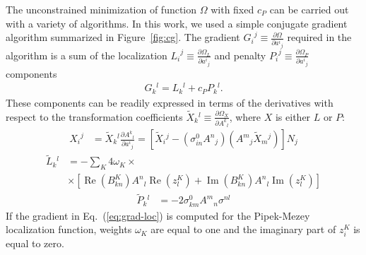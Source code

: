 \documentclass[aps,prl,reprint,amsmath,amssymb]{revtex4-1}
\begin{document}
The unconstrained minimization of function $\Omega$ with fixed $c_P$ can be carried out with a variety of algorithms. In this work, we used a simple conjugate gradient algorithm summarized in Figure~\ref{fig:cg}. The gradient ${G_i}^j \equiv \frac{\partial \Omega}{\partial {a^i}_j}$  required in the algorithm is a sum of the localization ${L_i}^j \equiv \frac{\partial \Omega_L}{\partial {a^i}_j}$ and penalty ${P_i}^j \equiv \frac{\partial \Omega_P}{\partial {a^i}_j}$ components
%
\begin{equation} \label{eq:grad}
\begin{split}
G{_k}^{l} = L{_k}^{l} + c_P P{_k}^{l}.
\end{split}
\end{equation}
%
These components can be readily expressed in terms of the derivatives with respect to the transformation coefficients $\tilde{X}{_k}^l \equiv \frac{\partial \Omega_X}{\partial {A^k}_l}$, where $X$ is either $L$ or $P$:
%
\begin{equation} \label{eq:grad-convert}
\begin{split}
{X_i}^j & = \tilde{X}{_k}^l \frac{\partial {A^k}_l}{\partial {a^i}_j} = \left[ \tilde{X}{_i}^j - ( \sigma_{in}^0 {A^n}_j ) ( {A^m}_j \tilde{X}{_m}^j ) \right] N_j 
\end{split}
\end{equation}
%
\begin{equation} \label{eq:grad-loc}
\begin{split}
\tilde{L}{_k}^l & = - \sum_K {4 \omega_K} \times \\ 
&\times \left[  \operatorname{Re}(B^{K}_{kn}) {A^{n}}_{l} \operatorname{Re}(z_{l}^{K}) + \operatorname{Im}(B^{K}_{kn}) {A^{n}}_{l} \operatorname{Im}(z_{l}^{K}) \right]
\end{split}
\end{equation}
%
\begin{equation} \label{eq:grad-pen}
\begin{split}
\tilde{P}{_k}^l & = -2 \sigma_{km}^0 {A^m}_n \sigma^{nl} 
\end{split}
\end{equation}
%
If the gradient in Eq.~(\ref{eq:grad-loc}) is computed for the Pipek-Mezey localization function, weights $\omega_K$ are equal to one and the imaginary part of $z_{i}^{K}$ is equal to zero.
\end{document}
